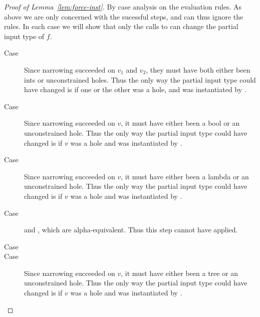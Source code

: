 \begin{proof}[Proof of Lemma~\ref{lem:force-inst}]
  By case analysis on the evaluation rules. As above we are only
  concerned with the sucessful steps, and can thus ignore the
   rules. In each case we will show that only
  the calls to \forcesym can change the partial input type of $f$.

  \begin{description}
  \item[Case \replusgood] Since narrowing succeeded on $v_1$ and $v_2$,
    they must have both either been ints or unconstrained holes. Thus
    the only way the partial input type could have changed is if one or the
    other was a hole, and was instantiated by \forcesym.
  \item[Case ] Since narrowing succeeded on
    $v$, it must have either been a bool or an unconstrained hole. Thus
    the only way the partial input type could have changed is if $v$ was a
    hole and was instantiated by \forcesym.
  \item[Case \reappgood] Since narrowing succeeded on $v$, it must have
    either been a lambda or an unconstrained hole. Thus the only way the
    partial input type could have changed is if $v$ was a hole and was
    instantiated by \forcesym.
  \item[Case \releafgood] \hastype{\eleaf}{\ttree{\thole}} and
    \hastype{\vleaf{\thole}}{\ttree{\thole}}, which are
    alpha-equivalent. Thus this step cannot have applied.
  \item[Case \renodegood] 
  \item[Case ] Since narrowing succeeded on
    $v$, it must have either been a tree or an unconstrained hole. Thus
    the only way the partial input type could have changed is if $v$ was a
    hole and was instantiated by \forcesym.
  \end{description}
\end{proof}

